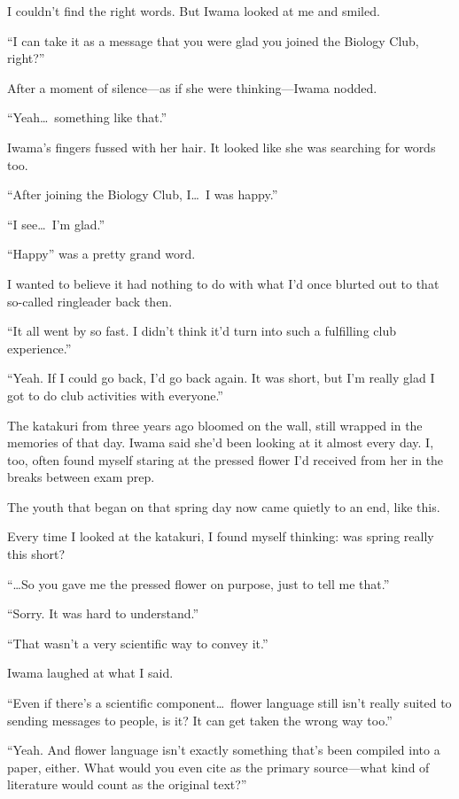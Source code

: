\documentclass[
    a4paper,
    12pt,
    twoside,
    openany,
    UTF8,
    fontset=windows
]{ctexbook}
\begin{document}
I couldn't find the right words. But Iwama looked at me and smiled.

``I can take it as a message that you were glad you joined the Biology Club, right?''

After a moment of silence---as if she were thinking---Iwama nodded.

``Yeah\dots\ something like that.''

Iwama's fingers fussed with her hair. It looked like she was searching for words too.

``After joining the Biology Club, I\dots\ I was happy.''

``I see\dots\ I'm glad.''

``Happy'' was a pretty grand word.

I wanted to believe it had nothing to do with what I'd once blurted out to that so-called ringleader back then.

``It all went by so fast. I didn't think it'd turn into such a fulfilling club experience.''

``Yeah. If I could go back, I'd go back again. It was short, but I'm really glad I got to do club activities with everyone.''

The katakuri from three years ago bloomed on the wall, still wrapped in the memories of that day. Iwama said she'd been looking at it almost every day. I, too, often found myself staring at the pressed flower I'd received from her in the breaks between exam prep.

The youth that began on that spring day now came quietly to an end, like this.

Every time I looked at the katakuri, I found myself thinking: was spring really this short?

``\dots So you gave me the pressed flower on purpose, just to tell me that.''

``Sorry. It was hard to understand.''

``That wasn't a very scientific way to convey it.''

Iwama laughed at what I said.

``Even if there's a scientific component\dots\ flower language still isn't really suited to sending messages to people, is it? It can get taken the wrong way too.''

``Yeah. And flower language isn't exactly something that's been compiled into a paper, either. What would you even cite as the primary source---what kind of literature would count as the original text?''
\end{document}
